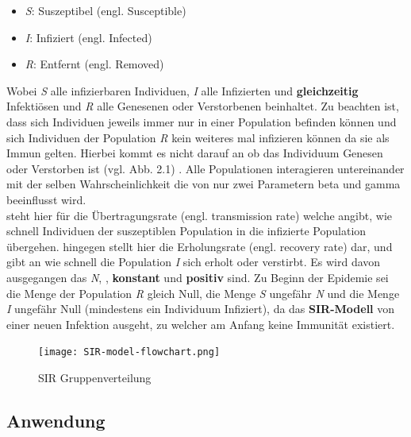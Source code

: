 \documentclass[12pt]{scrartcl} %
\begin{document}
\begin{itemize}
	\item \textit{S}: Suszeptibel (engl. Susceptible)
	\item \textit{I}: Infiziert (engl. Infected)
	\item \textit{R}: Entfernt (engl. Removed)
\end{itemize}
\normalsize

Wobei \textit{S} alle infizierbaren Individuen, \textit{I} alle Infizierten und \textbf{gleichzeitig} Infektiösen und \textit{R} alle Genesenen oder Verstorbenen beinhaltet.  Zu beachten ist, dass sich Individuen jeweils immer nur in einer Population befinden können und sich Individuen der Population 
\textit{R} kein weiteres mal infizieren können da sie als Immun gelten. Hierbei kommt es nicht darauf an ob das Individuum Genesen oder Verstorben ist (vgl. Abb. 2.1) \cite{4}.
Alle Populationen interagieren untereinander mit der selben Wahrscheinlichkeit die von nur zwei Parametern beta \textbeta\space und gamma \textgamma\space beeinflusst wird.\\
\textbeta \space steht hier für die Übertragungsrate (engl. transmission rate) welche angibt, wie schnell Individuen der suszeptiblen Population in die infizierte Population übergehen. 
\textgamma \space hingegen stellt hier die Erholungsrate (engl. recovery rate) dar, und gibt an wie schnell die Population \textit{I} sich erholt oder verstirbt.
Es wird davon ausgegangen das \textit{N}, \textbeta, \textgamma \space \textbf{konstant} und \textbf{positiv} sind.
Zu Beginn der Epidemie sei die Menge der Population \textsl{R} gleich Null, die Menge \textsl{S} ungefähr \textit{N} und die Menge \textit{I} ungefähr Null (mindestens ein Individuum Infiziert), da das \textbf{SIR-Modell} von einer neuen Infektion ausgeht, zu welcher am Anfang keine Immunität existiert.

	\begin{figure}[h]
	\centering
	\texttt{[image: SIR-model-flowchart.png]} 
	\caption[SIR Gruppenverteilung,\newline https://www.researchgate.net/figure/SIR-model-flowchart\textunderscore fig8]{SIR Gruppenverteilung}
	\end{figure}


\subsection{Anwendung}
\end{document}
